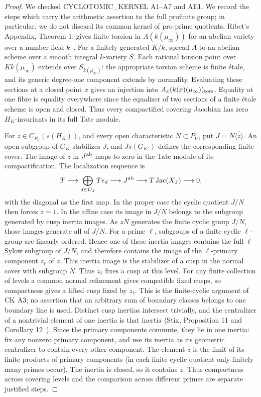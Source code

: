 \documentclass[11pt,oneside]{article}
\begin{document}
\begin{proof}
We checked CYCLOTOMIC\_KERNEL A1--A7 and AE1. We record the steps
which carry the arithmetic assertion to the full profinite group;
in particular, we do not discard its common kernel of pro-prime
quotients. Ribet's Appendix, Theorem 1, gives finite torsion in
$A(k(\mu_\infty))$ for an abelian variety over a number field
$k$~\cite{F-Ribet}. For a finitely generated $K/k$, spread $A$ to an
abelian scheme over a smooth integral $k$-variety $S$. Each rational
torsion point over $Kk(\mu_\infty)$ extends over $S_{k(\mu_\infty)}$:
the appropriate torsion scheme is finite \'etale, and its generic
degree-one component extends by normality. Evaluating these sections
at a closed point $x$ gives an injection into
$A_x(k(x)(\mu_\infty))_{\rm tors}$. Equality at one fibre is equality
everywhere since the equalizer of two sections of a finite \'etale
scheme is open and closed. Thus every compactified covering Jacobian
has zero $H_K$-invariants in its full Tate module.

For $z\in C_{P_U}(s(H_K))$, and every open characteristic
$N\subset P_U$, put $J=N\overline{\langle z\rangle}$. An open
subgroup of $G_K$ stabilizes $J$, and $Js(G_{K'})$ defines the
corresponding finite cover. The image of $z$ in $J^{\rm ab}$ maps
to zero in the Tate module of its compactification. The localization
sequence is
\[
 T\longrightarrow\bigoplus_{d\in D_J} T e_d
 \longrightarrow J^{\rm ab}\longrightarrow T\operatorname{Jac}(X_J)
 \longrightarrow0,
\]
with the diagonal as the first map. In the proper case the cyclic
quotient $J/N$ then forces $z=1$. In the affine case its image in
$J/N$ belongs to the subgroup generated by cusp inertia images.
As $zN$ generates the finite cyclic group $J/N$, those images generate
all of $J/N$. For a prime $\ell$, subgroups of a finite cyclic
$\ell$-group are linearly ordered. Hence one of these inertia images
contains the full $\ell$-Sylow subgroup of $J/N$, and therefore
contains the image of the $\ell$-primary component $z_\ell$ of $z$.
This inertia image is the stabilizer of a cusp in the normal cover
with subgroup $N$. Thus $z_\ell$ fixes a cusp at this level.
For any finite collection of levels a common normal refinement
gives compatible fixed cusps, so compactness gives a lifted cusp
fixed by $z_\ell$. This is the finite-cyclic argument of CK A3;
no assertion that an arbitrary sum of boundary classes belongs
to one boundary line is used. Distinct cusp inertias
intersect trivially, and the centralizer of a nontrivial element of
one inertia is that inertia (Stix, Proposition 11 and Corollary
12~\cite{F-Stix}). Since the primary components commute, they lie in
one inertia: fix any nonzero primary component, and use its
inertia as its geometric centralizer to contain every other
component. The element $z$ is the limit of its finite products
of primary components (in each finite cyclic quotient only
finitely many primes occur). The inertia is closed, so it
contains $z$. Thus compactness across covering levels and the
comparison across different primes are separate justified steps.


\end{proof}
\end{document}
